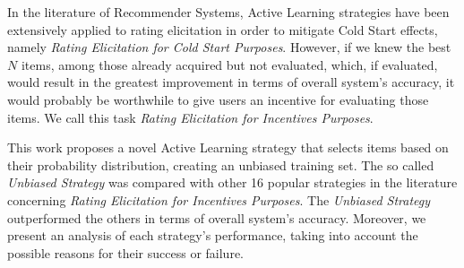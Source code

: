 \begin{foreignabstract}

In the literature of Recommender Systems, Active Learning strategies have been extensively applied to rating elicitation in order to mitigate Cold Start effects, namely \textit{Rating Elicitation for Cold Start Purposes}. However, if we knew the best $N$ items, among those already acquired but not evaluated, which, if evaluated, would result in the greatest improvement in terms of overall system's accuracy, it would probably be worthwhile to give users an incentive for evaluating those items. We call this task \textit{Rating Elicitation for Incentives Purposes}. 

This work proposes a novel Active Learning strategy that selects items based on their probability distribution, creating an unbiased training set. The so called \textit{Unbiased Strategy} was compared with other 16 popular strategies in the literature concerning \textit{Rating Elicitation for Incentives Purposes}. The \textit{Unbiased Strategy} outperformed  the others in terms of overall system's accuracy. Moreover, we present an analysis of each strategy's performance, taking into account the possible reasons for their success or failure.

\end{foreignabstract}


